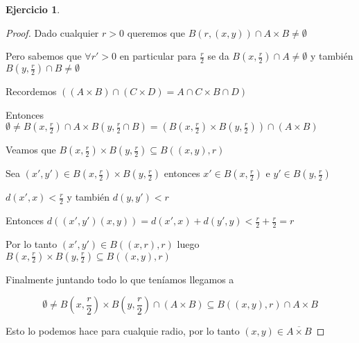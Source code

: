 \documentclass[12pt]{report}
\newcommand{\ol}{\overline}
\theoremstyle{definition}
\newtheorem{ej}{Ejercicio}
\begin{document}
\begin{ej}
\begin{enumerate}
\begin{proof}
	Dado cualquier $r>0$ queremos que $B(r,(x,y)) \cap A \times B \neq \emptyset$

	Pero sabemos que $\forall r' > 0$ en particular para $\frac{r}{2}$ se da $B(x,\frac{r}{2}) \cap A \neq \emptyset$ y también $B(y,\frac{r}{2}) \cap B \neq \emptyset$

	Recordemos $((A\times B) \cap (C \times D) = A \cap C \times B \cap D)$

	Entonces $\emptyset \neq B(x,\frac{r}{2}) \cap A \times B(y,\frac{r}{2} \cap B) = (B(x,\frac{r}{2}) \times B(y,\frac{r}{2})) \cap (A \times B)$

	Veamos que $B(x,\frac{r}{2}) \times B(y,\frac{r}{2}) \subseteq B((x,y),r)$

	Sea $(x',y') \in  B(x,\frac{r}{2}) \times B(y,\frac{r}{2})$ entonces $x' \in B(x,\frac{r}{2})$  e $y'\in B(y,\frac{r}{2})$

	$d(x',x) < \frac{r}{2}$ y también $d(y,y') < r$

	Entonces $d((x',y')(x,y)) = d(x',x) + d(y',y) < \frac{r}{2} + \frac{r}{2} = r$ 

	Por lo tanto $(x',y ') \in B((x,r),r)$ luego $B(x,\frac{r}{2}) \times B(y,\frac{r}{2})\subseteq B((x,y),r)$

	Finalmente juntando todo lo que teníamos llegamos a 

	$$ \emptyset \neq B(x,\frac{r}{2}) \times B(y,\frac{r}{2}) \cap (A \times B) \subseteq B((x,y),r) \cap A \times B$$

	Esto lo podemos hace para cualquie radio, por lo tanto $(x,y) \in \ol{A\times B}$

      \end{proof}
  \end{enumerate}
\end{ej}
\end{document}
